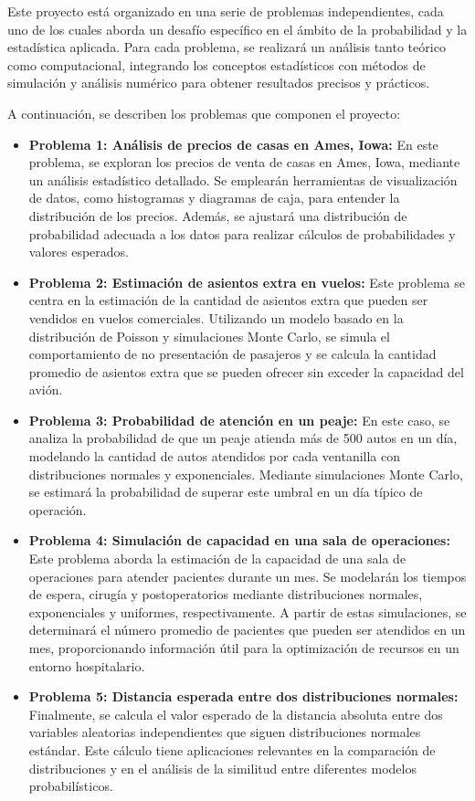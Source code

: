 \documentclass[12pt]{article}
\begin{document}
Este proyecto está organizado en una serie de problemas independientes, cada uno de los cuales aborda un desafío específico en el ámbito de la probabilidad y la estadística aplicada. Para cada problema, se realizará un análisis tanto teórico como computacional, integrando los conceptos estadísticos con métodos de simulación y análisis numérico para obtener resultados precisos y prácticos.

A continuación, se describen los problemas que componen el proyecto:

\begin{itemize}
    \item \textbf{Problema 1: Análisis de precios de casas en Ames, Iowa:} En este problema, se exploran los precios de venta de casas en Ames, Iowa, mediante un análisis estadístico detallado. Se emplearán herramientas de visualización de datos, como histogramas y diagramas de caja, para entender la distribución de los precios. Además, se ajustará una distribución de probabilidad adecuada a los datos para realizar cálculos de probabilidades y valores esperados.
    
    \item \textbf{Problema 2: Estimación de asientos extra en vuelos:} Este problema se centra en la estimación de la cantidad de asientos extra que pueden ser vendidos en vuelos comerciales. Utilizando un modelo basado en la distribución de Poisson y simulaciones Monte Carlo, se simula el comportamiento de no presentación de pasajeros y se calcula la cantidad promedio de asientos extra que se pueden ofrecer sin exceder la capacidad del avión.
    
    \item \textbf{Problema 3: Probabilidad de atención en un peaje:} En este caso, se analiza la probabilidad de que un peaje atienda más de 500 autos en un día, modelando la cantidad de autos atendidos por cada ventanilla con distribuciones normales y exponenciales. Mediante simulaciones Monte Carlo, se estimará la probabilidad de superar este umbral en un día típico de operación.
    
    \item \textbf{Problema 4: Simulación de capacidad en una sala de operaciones:} Este problema aborda la estimación de la capacidad de una sala de operaciones para atender pacientes durante un mes. Se modelarán los tiempos de espera, cirugía y postoperatorios mediante distribuciones normales, exponenciales y uniformes, respectivamente. A partir de estas simulaciones, se determinará el número promedio de pacientes que pueden ser atendidos en un mes, proporcionando información útil para la optimización de recursos en un entorno hospitalario.
    
    \item \textbf{Problema 5: Distancia esperada entre dos distribuciones normales:} Finalmente, se calcula el valor esperado de la distancia absoluta entre dos variables aleatorias independientes que siguen distribuciones normales estándar. Este cálculo tiene aplicaciones relevantes en la comparación de distribuciones y en el análisis de la similitud entre diferentes modelos probabilísticos.
\end{itemize}
\end{document}
